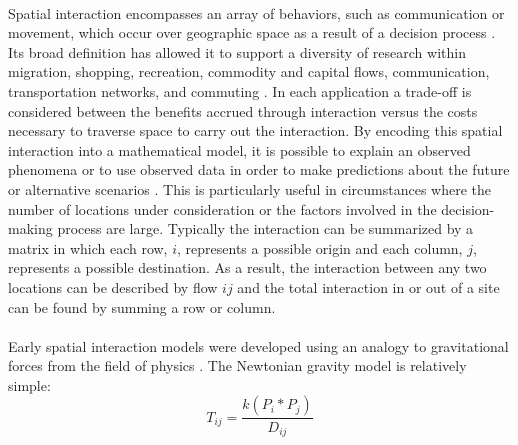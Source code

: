 \documentclass[12pt,a4paper]{thesis}
\begin{document}
\paragraph{}
Spatial interaction encompasses an array of behaviors, such as communication or movement, which occur over geographic space as a result of a decision process \citep{FotOke89}. Its broad definition has allowed it to support a diversity of research within migration, shopping, recreation, commodity and capital flows, communication, transportation networks, and commuting \citep{FotHay}. In each application a trade-off is considered between the benefits accrued through interaction versus the costs necessary to traverse space to carry out the interaction. By encoding this spatial interaction into a mathematical model, it is possible to explain an observed phenomena or to use observed data in order to make predictions about the future or alternative scenarios \citep{FotOke89}. This is particularly useful in circumstances where the number of locations under consideration or the factors involved in the decision-making process are large. Typically the interaction can be summarized by a matrix in which each row, $i$,  represents a possible origin and each column, $j$, represents a possible destination. As a result, the interaction between any two locations can be described by flow $ij$ and the total interaction in or out of a site can be found by summing a row or column.    
	
\paragraph{}
Early spatial interaction models were developed using an analogy to gravitational forces from the field of physics \citep{RoyThi04}. The Newtonian gravity model is relatively simple:\\
				\begin{equation}
				T_{ij} = \frac{k(P_{i}*P_{j})}{D_{ij}}
				\label{eq:simpleGrav}
				\end{equation}
				
\end{document}
